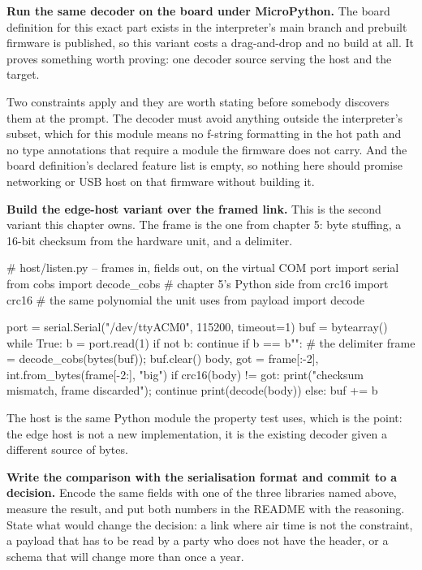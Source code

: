 \begin{steps}
\item \textbf{Run the same decoder on the board under MicroPython.} The board
definition for this exact part exists in the interpreter's main branch and
prebuilt firmware is published, so this variant costs a drag-and-drop and no
build at all. It proves something worth proving: one decoder source serving the
host and the target.
Two constraints apply and they are worth stating before somebody discovers them
at the prompt. The decoder must avoid anything outside the interpreter's
subset, which for this module means no f-string formatting in the hot path and
no type annotations that require a module the firmware does not carry. And the
board definition's declared feature list is empty, so nothing here should
promise networking or USB host on that firmware without building it.

\item \textbf{Build the edge-host variant over the framed link.} This is the
second variant this chapter owns. The frame is the one from chapter 5: byte
stuffing, a 16-bit checksum from the hardware unit, and a delimiter.
\begin{pycode}
# host/listen.py -- frames in, fields out, on the virtual COM port
import serial
from cobs import decode_cobs          # chapter 5's Python side
from crc16 import crc16               # the same polynomial the unit uses
from payload import decode

port = serial.Serial("/dev/ttyACM0", 115200, timeout=1)
buf = bytearray()
while True:
    b = port.read(1)
    if not b:
        continue
    if b == b"":                  # the delimiter
        frame = decode_cobs(bytes(buf)); buf.clear()
        body, got = frame[:-2], int.from_bytes(frame[-2:], "big")
        if crc16(body) != got:
            print("checksum mismatch, frame discarded"); continue
        print(decode(body))
    else:
        buf += b
\end{pycode}
The host is the same Python module the property test uses, which is the point:
the edge host is not a new implementation, it is the existing decoder given a
different source of bytes.

\item \textbf{Write the comparison with the serialisation format and commit
to a decision.} Encode the same fields with one of the three libraries named
above, measure the result, and put both numbers in the README with the
reasoning. State what would change the decision: a link where air time is not
the constraint, a payload that has to be read by a party who does not have the
header, or a schema that will change more than once a year.
\end{steps}

